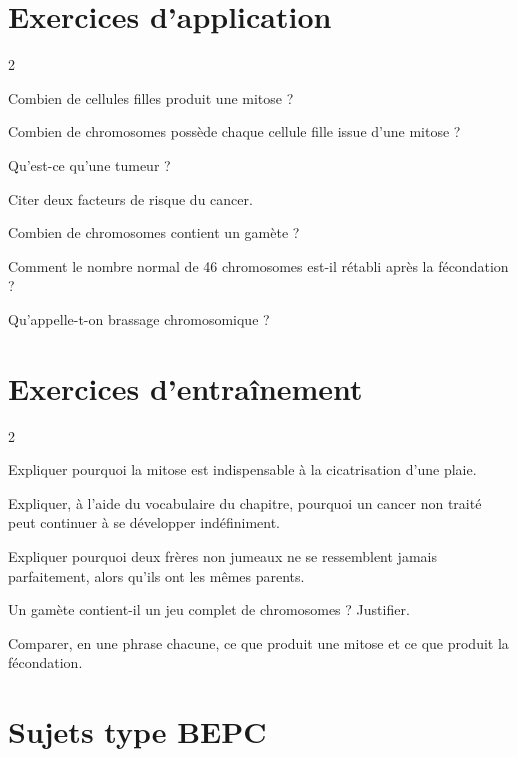 \section{Exercices d'application}
\begin{multicols}{2}

\exo{} Combien de cellules filles produit une mitose ?

\exo{} Combien de chromosomes possède chaque cellule fille issue d'une
mitose ?

\exo{} Qu'est-ce qu'une tumeur ?

\exo{} Citer deux facteurs de risque du cancer.

\exo{} Combien de chromosomes contient un gamète ?

\exo{} Comment le nombre normal de 46 chromosomes est-il rétabli après la
fécondation ?

\exo{} Qu'appelle-t-on brassage chromosomique ?

\end{multicols}

\section{Exercices d'entraînement}
\begin{multicols}{2}

\exo{} Expliquer pourquoi la mitose est indispensable à la cicatrisation d'une
plaie.

\exo{} Expliquer, à l'aide du vocabulaire du chapitre, pourquoi un cancer non
traité peut continuer à se développer indéfiniment.

\exo{} Expliquer pourquoi deux frères non jumeaux ne se ressemblent jamais
parfaitement, alors qu'ils ont les mêmes parents.

\exo{} Un gamète contient-il un jeu complet de chromosomes ? Justifier.

\exo{} Comparer, en une phrase chacune, ce que produit une mitose et ce que
produit la fécondation.

\end{multicols}

\section{Sujets type BEPC}

